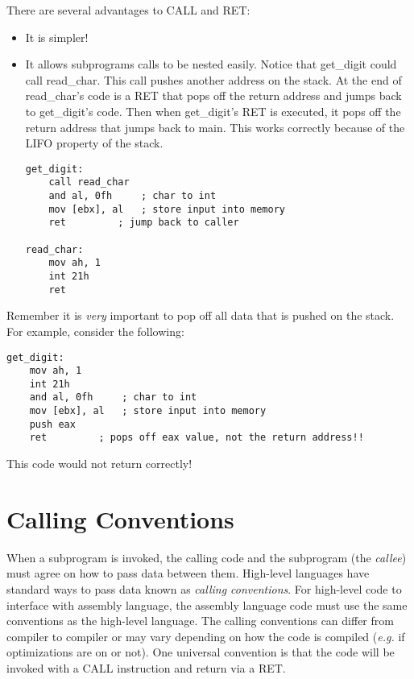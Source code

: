 There are several advantages to CALL and RET:
\begin{itemize}
\item It is simpler!
\item It allows subprograms calls to be nested easily. Notice that
{\code get\_digit} could call {\code read\_char}. This call pushes another address
on the stack. At the end of {\code read\_char}'s code is a RET that pops
off the return address and jumps back to {\code get\_digit}'s code. Then when
{\code get\_digit}'s RET is executed, it pops off the return address that 
jumps back to {\code main}. This works correctly because of the LIFO
property of the stack.
\begin{lstlisting}[language={[x86masm]Assembler}]
get_digit:
    call read_char
    and al, 0fh     ; char to int
    mov [ebx], al   ; store input into memory
    ret         ; jump back to caller

read_char:
    mov ah, 1
    int 21h
    ret
\end{lstlisting}
\end{itemize}

Remember it is \emph{very} important to pop off all data that is pushed
on the stack. For example, consider the following:
\begin{lstlisting}[language={[x86masm]Assembler}]
get_digit:
    mov ah, 1
    int 21h
    and al, 0fh     ; char to int
    mov [ebx], al   ; store input into memory
    push eax
    ret         ; pops off eax value, not the return address!! 
\end{lstlisting}
This code would not return correctly!

\section{Calling Conventions}

When a subprogram is invoked, the calling code and the subprogram (the
\emph{callee}) must agree on how to pass data between them. High-level
languages have standard ways to pass data known as \emph{calling 
conventions}. For high-level code to interface with assembly language, the
assembly language code must use the same conventions as the high-level
language. The calling conventions can differ from compiler to compiler or
may vary depending on how the code is compiled (\emph{e.g.} if
optimizations are on or not). One universal convention is that the code will
be invoked with a {\code CALL} instruction and return via a {\code RET}.

